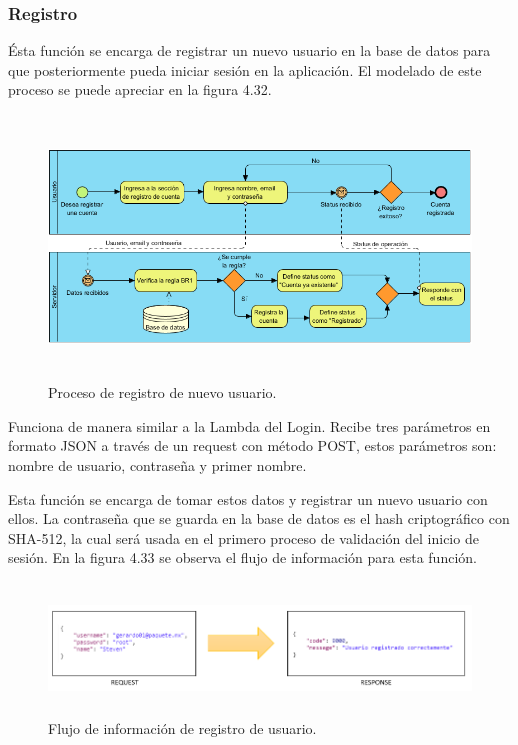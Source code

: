 \subsubsection{Registro}
Ésta función se encarga de registrar un nuevo usuario en la base de datos para que posteriormente pueda iniciar sesión en la aplicación. El modelado de este proceso se puede apreciar en la figura 4.32. \par
\begin{figure}[h!]
	\centering
	\includegraphics[width=15cm,height=7cm]{imagenes/desarrollo/diagramas/BPMN_REGISTRAR_CUENTA.png}
	\caption{Proceso de registro de nuevo usuario.}
	\label{fig:regsuccess}
\end{figure}


Funciona de manera similar a la Lambda del Login. Recibe tres parámetros en formato JSON a través de un request con método POST, estos parámetros son: nombre de usuario, contraseña y primer nombre. \par
Esta función se encarga de tomar estos datos y registrar un nuevo usuario con ellos. La contraseña que se guarda en la base de datos es el hash criptográfico con SHA-512, la cual será usada en el primero proceso de validación del inicio de sesión. En la figura 4.33 se observa el flujo de información para esta función.
\begin{figure}[h!]
	\centering
	\includegraphics[width=15cm,height=3.5cm]{imagenes/desarrollo/arquitectura/REGISTER_SUCCESS.png}
	\caption{Flujo de información de registro de usuario.}
	\label{fig:regsuccess}
\end{figure}
\par


